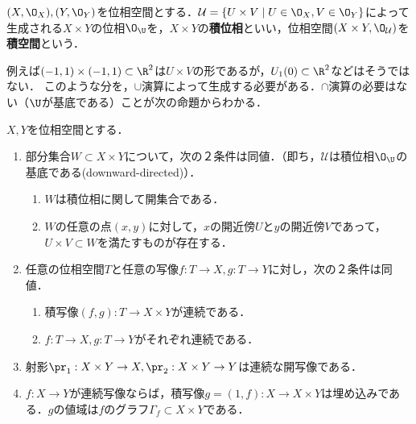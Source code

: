 \documentclass[uplatex,dvipdfmx]{jsreport}
\begin{document}
\begin{definition}
    $(X,\O_X),(Y,\O_Y)$を位相空間とする．$\mathcal{U}=\{U\times V\mid U\in\O_X,V\in\O_Y\}$によって生成される$X\times Y$の位相$\O_\U$を，$X\times Y$の\textbf{積位相}といい，位相空間$(X\times Y,\O_\mathcal{U})$を\textbf{積空間}という．
\end{definition}
\begin{remarks}\label{remarks-cup-onliness-of-product-topology}
    例えば$(-1,1)\times(-1,1)\subset\R^2$は$U\times V$の形であるが，$U_1(0)\subset\R^2$などはそうではない．
    このような分を，$\cup$演算によって生成する必要がある．$\cap$演算の必要はない（$\U$が基底である）ことが次の命題からわかる．
\end{remarks}

\begin{proposition}\label{prop-characterization-product-topology}
    $X,Y$を位相空間とする．
    \begin{enumerate}
        \item 部分集合$W\subset X\times Y$について，次の２条件は同値．（即ち，$\mathcal{U}$は積位相$\O_\U$の基底である(downward-directed)）．
        \begin{enumerate}[(1)]
            \item $W$は積位相に関して開集合である．
            \item $W$の任意の点$(x,y)$に対して，$x$の開近傍$U$と$y$の開近傍$V$であって，$U\times V\subset W$を満たすものが存在する．
        \end{enumerate}
        \item 任意の位相空間$T$と任意の写像$f:T\to X,g:T\to Y$に対し，次の２条件は同値．
        \begin{enumerate}[(1)]
            \item 積写像$(f,g):T\to X\times Y$が連続である．
            \item $f:T\to X,g:T\to Y$がそれぞれ連続である．
        \end{enumerate}
        \item 射影$\pr_1:X\times Y\to X,\pr_2:X\times Y\to Y$は連続な開写像である．
        \item $f:X\to Y$が連続写像ならば，積写像$g=(1,f):X\to X\times Y$は埋め込みである．$g$の値域は$f$のグラフ$\Gamma_f\subset X\times Y$である．
    \end{enumerate}
\end{proposition}
\end{document}

